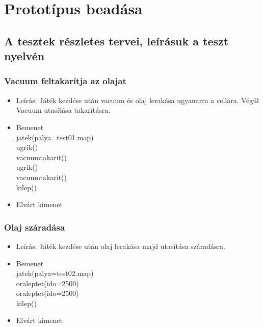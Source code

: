 %
\chapter{Prototípus beadása}

\thispagestyle{fancy}

\setcounter{section}{-1}
\section{A tesztek részletes tervei, leírásuk a teszt nyelvén}


\subsection{Vacuum feltakarítja az olajat}
\begin{itemize}
	\item Leírás: Játék kezdése után vacuum és olaj lerakása ugyanarra a cellára. Végül Vacuum utasítása takarításra.
	\item Bemenet\\
    jatek(palya=test01.map) \\
    ugrik() \\
    vacuumtakarit() \\
    ugrik() \\
    vacuumtakarit() \\
    kilep() \\
	\item Elvárt kimenet\\

\end{itemize}

\subsection{Olaj száradása}
\begin{itemize}
	\item Leírás: Játék kezdése után olaj lerakása majd utasítása száradásra.
	\item Bemenet\\
    jatek(palya=test02.map) \\
    oraleptet(ido=2500) \\
    oraleptet(ido=2500) \\
    kilep() \\
	\item Elvárt kimenet\\
	
\end{itemize}

